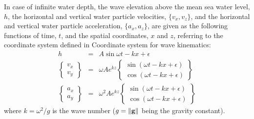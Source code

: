 
In case of infinite water depth, the wave elevation above the mean sea water
level, $h$, the horizontal and vertical water particle velocities,
$\{v_x,v_z\}$, and the horizontal and vertical water particle acceleration,
$\{a_x,a_z\}$, are given as the following functions of time, $t$,
and the spatial coordinates, $x$ and $z$,
referring to the coordinate system defined in
           {Coordinate system for wave kinematics}:
%
\begin{eqnarray}
 h \;\;\;\;&=& A \sin\omega t - kx + \epsilon \\[2mm]
 \left\{\!\!\begin{array}{c} v_x \\ v_y \end{array}\!\!\right\} &=&
 \omega Ae^{kz}\left\{\begin{array}{c}
  \sin\left(\omega t - kx + \epsilon\right) \\
  \cos\left(\omega t - kx + \epsilon\right)
 \end{array}\right\} \\[2mm]
 \left\{\!\!\begin{array}{c} a_x \\ a_y \end{array}\!\!\right\} &=&
 \omega^2Ae^{kz}\left\{\begin{array}{c}
  \sin\left(\omega t - kx + \epsilon\right) \\
  \cos\left(\omega t - kx + \epsilon\right)
 \end{array}\right\}
\end{eqnarray}
%
where $k=\omega^2/g$ is the wave number
($g=\|{\bf g}\|$ being the gravity constant).

